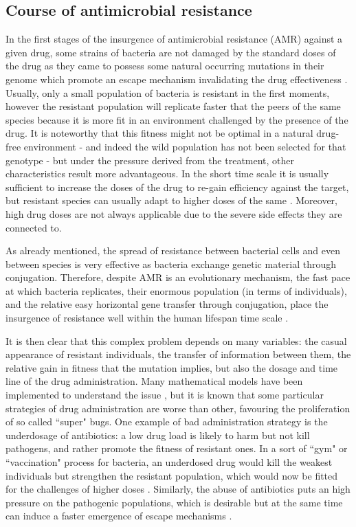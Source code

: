 \subsection{Course of antimicrobial resistance} \label{sec:course_AMR}
In the first stages of the insurgence of antimicrobial resistance (AMR) against a given drug, some strains of bacteria are not damaged by the standard doses of the drug as they came to possess some natural occurring mutations in their genome which promote an escape mechanism invalidating the drug effectiveness \cite{Kapoor2017,Blair2014}. Usually, only a small population of bacteria is resistant  in the first moments, however the resistant population will replicate faster that the peers of the same species because it is more fit in an environment challenged by the presence of the drug. It is noteworthy that this fitness might not be optimal in a natural drug-free environment - and indeed the wild population has not been selected for that genotype - but under the pressure derived from the treatment, other characteristics result more advantageous.
%
In the short time scale it is usually sufficient to increase the doses of the drug to re-gain efficiency against the target, but resistant species can usually adapt to higher doses of the same \cite{????}. Moreover, high drug doses are not always applicable due to the severe side effects they are connected to.

As already mentioned, the spread of resistance between bacterial cells and even between species is very effective as bacteria exchange genetic material through conjugation.
%
Therefore, despite AMR is an evolutionary mechanism, the fast pace at which bacteria replicates, their enormous population (in terms of individuals), and the relative easy horizontal gene transfer through conjugation, place the insurgence of resistance well within the human lifespan time scale \cite{????}.

It is then clear that this complex problem depends on many variables: the casual appearance of resistant individuals, the transfer of information between them, the relative gain in fitness that the mutation implies, but also the dosage and time line of the drug administration. Many mathematical models have been implemented to understand the issue \cite{Birkegard2018,Niewiadomska2019}, but it is known that some particular strategies of drug administration are worse than other, favouring the proliferation of so called ``super" bugs.
%
One example of bad administration strategy is the underdosage of antibiotics: a low drug load is likely to harm but not kill pathogens, and rather promote the fitness of resistant ones. In a sort of ``gym" or ``vaccination" process for bacteria, an underdosed drug would kill the weakest individuals but strengthen the resistant population, which would now be fitted for the challenges of higher doses \cite{????}.
%
Similarly, the abuse of antibiotics puts an high pressure on the pathogenic populations, which is desirable but at the same time can induce a faster emergence of escape mechanisms \cite{????}.

